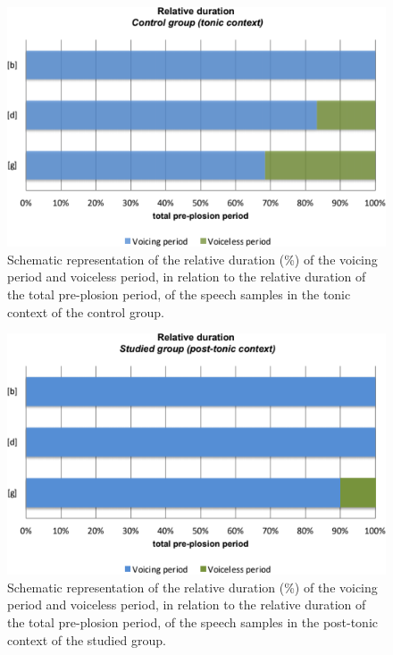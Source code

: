 \begin{figure}
\centering
\includegraphics[width=0.9\linewidth]{imgs/gregio-image10.png}
\caption{Schematic representation of the relative duration (\%) of the voicing period and voiceless period, in relation to the relative duration of the total pre-plosion period, of the speech samples in the tonic context of the control group.} 
\label{gregio-fig10}
\end{figure}

\begin{figure}
\centering
\includegraphics[width=\linewidth]{imgs/gregio-image11.png}
\caption{Schematic representation of the relative duration (\%) of the voicing period and voiceless period, in relation to the relative duration of the total pre-plosion period, of the speech samples in the post-tonic context of the studied group.} 
\label{gregio-fig11}
\end{figure}

